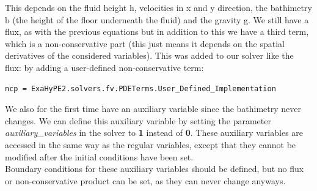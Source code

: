 \documentclass[12pt,letterpaper]{article}
\begin{document}
This depends on the fluid height h, velocities in x and y direction, the bathimetry b (the height of the floor underneath the fluid) and the gravity g. We still have a flux, as with the previous equations but in addition to this we have a third term, which is a non-conservative part (this just means it depends on the spatial derivatives of the considered variables). This was added to our solver like the flux: by adding a user-defined non-conservative term:

\begin{lstlisting}[style = Python]
  ncp = ExaHyPE2.solvers.fv.PDETerms.User_Defined_Implementation
\end{lstlisting}

We also for the first time have an auxiliary variable since the bathimetry never changes. We can define this auxiliary variable by setting the parameter \textit{auxiliary\_variables} in the solver to \textbf{1} instead of \textbf{0}. These auxiliary variables are accessed in the same way as the regular variables, except that they cannot be modified after the initial conditions have been set.\\
Boundary conditions for these auxiliary variables should be defined, but no flux or non-conservative product can be set, as they can never change anyways.
\end{document}
